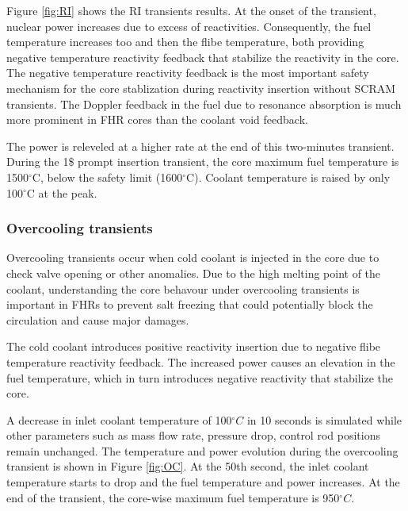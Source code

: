 \documentclass{elsarticle}
\begin{document}
Figure \ref{fig:RI} shows the RI transients results. At the onset of the transient, nuclear power increases due to excess of reactivities. Consequently, the fuel temperature increases too and then the flibe temperature, both providing negative temperature reactivity feedback that stabilize the reactivity in the core. 
The negative temperature reactivity feedback is the most important safety mechanism for the core stablization during reactivity insertion without SCRAM transients. The Doppler feedback in the fuel due to resonance absorption is much more prominent in FHR cores than the coolant void feedback.

The power is releveled at a higher rate at the end of this two-minutes transient. During the 1\$ prompt insertion transient, the core maximum fuel temperature is 1500$^{\circ}$C, below the safety limit (1600$^{\circ}$C). 
Coolant temperature is raised by only 100$^{\circ}$C at the peak. 






\subsubsection{Overcooling transients}
Overcooling transients occur when cold coolant is injected in the core due to check valve opening or other anomalies. Due to the high melting point of the coolant, understanding the core behavour under overcooling transients is important in FHRs to prevent salt freezing that could potentially block the circulation and cause major damages.

 The cold coolant introduces positive reactivity insertion due to negative flibe temperature reactivity feedback. The increased power causes an elevation in the fuel temperature, which in turn introduces negative reactivity that stabilize the core. 

A decrease in inlet coolant temperature of 100$^{\circ}C$ in 10 seconds is simulated while other parameters such as mass flow rate, pressure drop, control rod positions remain unchanged. The temperature and power evolution during the overcooling transient is shown in Figure \ref{fig:OC}. At the 50th second, the inlet coolant temperature starts to drop and the fuel temperature and power increases. At the end of the transient, the core-wise maximum fuel temperature is 950$^{\circ}C$. 
\end{document}

